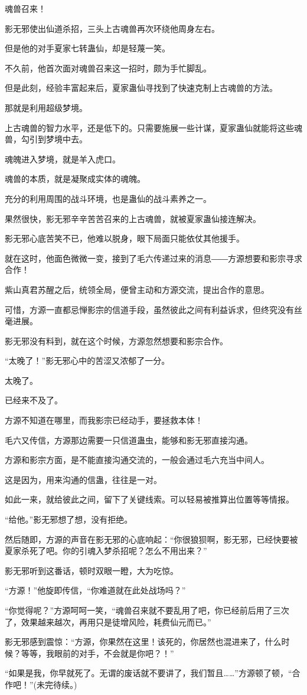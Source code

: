 \begin{this_body}
魂兽召来！

影无邪使出仙道杀招，三头上古魂兽再次环绕他周身左右。

但是他的对手夏家七转蛊仙，却是轻蔑一笑。

不久前，他首次面对魂兽召来这一招时，颇为手忙脚乱。

但是此刻，经验丰富起来后，夏家蛊仙寻找到了快速克制上古魂兽的方法。

那就是利用超级梦境。

上古魂兽的智力水平，还是低下的。只需要施展一些计谋，夏家蛊仙就能将这些魂兽，勾引到梦境中去。

魂魄进入梦境，就是羊入虎口。

魂兽的本质，就是凝聚成实体的魂魄。

充分的利用周围的战斗环境，也是蛊仙的战斗素养之一。

果然很快，影无邪辛辛苦苦召来的上古魂兽，就被夏家蛊仙接连解决。

影无邪心底苦笑不已，他难以脱身，眼下局面只能依仗其他援手。

就在这时，他面色微微一变，接到了毛六传递过来的消息――方源想要和影宗寻求合作！

紫山真君苏醒之后，统领全局，便曾主动和方源交流，提出合作的意思。

可惜，方源一直都忌惮影宗的信道手段，虽然彼此之间有利益诉求，但终究没有丝毫进展。

影无邪没有料到，就在这个时候，方源忽然想要和影宗合作。

“太晚了！”影无邪心中的苦涩又浓郁了一分。

太晚了。

已经来不及了。

方源不知道在哪里，而我影宗已经动手，要拯救本体！

毛六又传信，方源那边需要一只信道蛊虫，能够和影无邪直接沟通。

方源和影宗方面，是不能直接沟通交流的，一般会通过毛六充当中间人。

这是因为，用来沟通的信蛊，往往是一对。

如此一来，就给彼此之间，留下了关键线索。可以轻易被推算出位置等等情报。

“给他。”影无邪想了想，没有拒绝。

然后随即，方源的声音在影无邪的心底响起：“你很狼狈啊，影无邪，已经快要被夏家杀死了吧。你的引魂入梦杀招呢？怎么不用出来？”

影无邪听到这番话，顿时双眼一瞪，大为吃惊。

“方源！”他旋即传信，“你难道就在此处战场吗？”

“你觉得呢？”方源呵呵一笑，“魂兽召来就不要乱用了吧，你已经前后用了三次了，效果越来越次，再用只是徒增风险，耗费仙元而已。”

影无邪感到震惊：“方源，你果然在这里！该死的，你居然也混进来了，什么时候？等等，我眼前的对手，不会就是你吧？！”

“如果是我，你早就死了。无谓的废话就不要讲了，我们暂且……”方源顿了顿，“合作吧！”(未完待续。)

\end{this_body}

